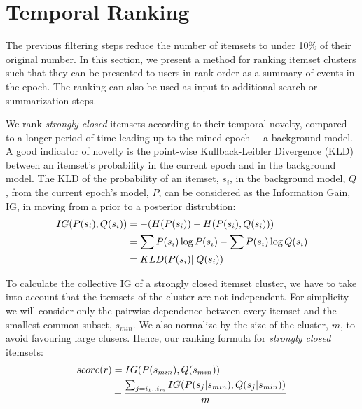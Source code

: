 \documentclass{sig-alternate}
\begin{document}
\section{Temporal Ranking}
\label{sec:rank}
The previous filtering steps reduce the number of itemsets to 
under 10\% of their original number.
In this section, we present a method for ranking itemset clusters 
such that they can
be presented to users in rank order
as a summary of events in the epoch.
The ranking can also be
used as input to additional search or
summarization steps.

We rank \emph{strongly closed} itemsets according 
to their temporal novelty,
compared to 
a longer period of time 
leading up to the mined epoch
--~a background model.
A good indicator of novelty is the point-wise Kullback-Leibler Divergence (KLD)
between an itemset's probability in the current epoch and in the background model.
The KLD of the probability of an itemset, $s_i$, in the background
model, $Q$, from the current epoch's model, $P$, can be considered as
the Information Gain, IG, in moving from a prior to a posterior distrubtion: 
\begin{align}IG(P(s_i),Q(s_i))  &= - (H(P(s_i)) - H(P(s_i),Q(s_i))) \notag\\ &= \sum{P(s_i) \log{P(s_i)}} - \sum{P(s_i) \log{Q(s_i)}} \notag\\ &= KLD(P(s_i)||Q(s_i))\end{align}

To calculate the collective IG of a strongly closed itemset cluster,
we have to take into account that the itemsets of the cluster are not independent. 
For simplicity we will consider only the pairwise dependence between 
every itemset and the smallest common subset, $s_{min}$.
We also normalize by the size of the cluster, $m$, to avoid favouring large clusers. Hence, our ranking formula for
\emph{strongly closed} itemsets:
\begin{align}\label{eq:avgIG}score(r) &= IG(P(s_{min}), Q(s_{min})) \notag\\ &+ \frac{ \sum_{ j = i_1..i_m } { IG(P(s_j|s_{min}), Q(s_j|s_{min})) } } { m } \end{align}
\end{document}
